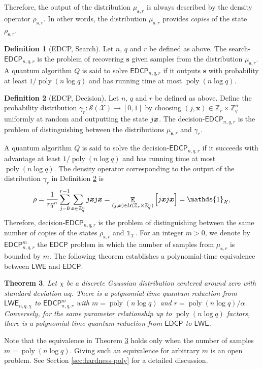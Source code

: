 \documentclass[11pt]{article}
\theoremstyle{plain}
\newtheorem{theorem}{Theorem}
\theoremstyle{definition}
\newtheorem{definition}[theorem]{Definition}
\DeclareMathOperator{\poly}{poly}
\DeclareMathOperator{\E}{\mathbb{E}}
\let\ket\relax
\DeclarePairedDelimiter{\ket}{\lvert}{\rangle}
\let\bra\relax
\DeclarePairedDelimiter{\bra}{\langle}{\rvert}
\def\Z{\mathbb{Z}}
\def\lwe{\mathsf{LWE}}
\def\edcp{\mathsf{EDCP}}
\def\X{\mathcal{X}}
\def\SX{\mathcal{S(X)}}
\def\U{\mathcal{U}}
\begin{document}
Therefore, the output of the distribution $\mu_{\bm{s}, r}$ is always described by the density operator $\rho_{\bm{s}, r}$. In other words, the distribution $\mu_{\bm{s}, r}$ provides \textit{copies} of the state $\rho_{\bm{s}, r}$.
\begin{definition}[EDCP, Search]
    Let $n$, $q$ and $r$ be defined as above. The search-$\edcp_{n, q, r}$ is the problem of recovering $\bm{s}$ given samples from the distribution $\mu_{\bm{s}, r}$. A quantum algorithm $Q$ is said to solve $\edcp_{n, q, r}$ if it outputs $\bm{s}$ with probability at least $1 / \poly(n\log q)$ and has running time at most $\poly(n\log q)$.
\end{definition}
\begin{definition}[EDCP, Decision]
    \label{def:d-edcp}
    Let $n$, $q$ and $r$ be defined as above. Define the probability distribution $\gamma_r: \SX \rightarrow [0, 1]$ by choosing $(j, \bm{x}) \in \Z_r \times \Z_q^n$ uniformly at random and outputting the state $\ket{j}\ket{\bm{x}}$. The decision-$\edcp_{n, q, r}$ is the problem of distinguishing between the distributions $\mu_{\bm{s}, r}$ and $\gamma_r$.
\end{definition}
A quantum algorithm $Q$ is said to solve the decision-$\edcp_{n, q, r}$ if it succeeds with advantage at least $1 / \poly(n\log q)$ and has running time at most $\poly(n\log q)$. The density operator corresponding to the output of the distribution $\gamma_r$ in Definition \ref{def:d-edcp} is
\[ \rho = \frac{1}{rq^n} \sum_{j = 0}^{r - 1} \sum_{\bm{x} \in \Z_q^n}  \ket{j}\ket{\bm{x}} \bra{j}\bra{\bm{x}} = \E_{(j, \bm{x}) \in \U(\Z_r \times \Z_q^n)} \Big[ \ket{j}\ket{\bm{x}} \bra{j}\bra{\bm{x}} \Big] = \mathds{1}_{\X}, \]
Therefore, decision-$\edcp_{n, q, r}$ is the problem of distinguishing between the same number of copies of the states $\rho_{\bm{s}, r}$ and $\mathds{1}_{\X}$. For an integer $m > 0$, we denote by $\edcp_{n, q, r}^m$ the $\edcp$ problem in which the number of samples from $\mu_{\bm{s}, r}$ is bounded by $m$. The following theorem establishes a polynomial-time equivalence between $\lwe$ and $\edcp$.
\begin{theorem}
    \label{thm:lwe-edcp}
    Let $\chi$ be a discrete Gaussian distribution centered around zero with standard deviation $\alpha q$. There is a polynomial-time quantum reduction from $\lwe_{n, q, \chi}$ to $\edcp_{n, q, r}^m$ with $m = \poly(n\log q)$ and $r = \poly(n\log q) / \alpha$. Conversely, for the same parameter relationship up to $\poly(n\log q)$ factors, there is a polynomial-time quantum reduction from $\edcp$ to $\lwe$. 
\end{theorem}
Note that the equivalence in Theorem \ref{thm:lwe-edcp} holds only when the number of samples $m = \poly(n\log q)$. Giving such an equivalence for arbitrary $m$ is an open problem. See Section \ref{sec:hardness-poly} for a detailed discussion.
\end{document}
